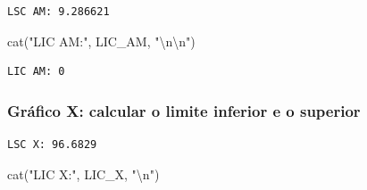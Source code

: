\documentclass[
  letterpaper,
  DIV=11,
  numbers=noendperiod]{scrartcl}
\newenvironment{Shaded}{\begin{snugshade}}{\end{snugshade}}
\newcommand{\AttributeTok}[1]{\textcolor[rgb]{0.40,0.45,0.13}{#1}}
\newcommand{\CommentTok}[1]{\textcolor[rgb]{0.37,0.37,0.37}{#1}}
\newcommand{\ConstantTok}[1]{\textcolor[rgb]{0.56,0.35,0.01}{#1}}
\newcommand{\DecValTok}[1]{\textcolor[rgb]{0.68,0.00,0.00}{#1}}
\newcommand{\FloatTok}[1]{\textcolor[rgb]{0.68,0.00,0.00}{#1}}
\newcommand{\FunctionTok}[1]{\textcolor[rgb]{0.28,0.35,0.67}{#1}}
\newcommand{\NormalTok}[1]{\textcolor[rgb]{0.00,0.23,0.31}{#1}}
\newcommand{\OtherTok}[1]{\textcolor[rgb]{0.00,0.23,0.31}{#1}}
\newcommand{\SpecialCharTok}[1]{\textcolor[rgb]{0.37,0.37,0.37}{#1}}
\newcommand{\StringTok}[1]{\textcolor[rgb]{0.13,0.47,0.30}{#1}}
\begin{document}
\begin{verbatim}
LSC AM: 9.286621 
\end{verbatim}

\begin{Shaded}
\begin{Highlighting}[]
\FunctionTok{cat}\NormalTok{(}\StringTok{"LIC AM:"}\NormalTok{, LIC\_AM, }\StringTok{"}\SpecialCharTok{\textbackslash{}n\textbackslash{}n}\StringTok{"}\NormalTok{)}
\end{Highlighting}
\end{Shaded}

\begin{verbatim}
LIC AM: 0 
\end{verbatim}

\subsubsection{Gráfico X: calcular o limite inferior e o
superior}\label{gruxe1fico-x-calcular-o-limite-inferior-e-o-superior}

\begin{Shaded}
\end{Shaded}

\begin{verbatim}
LSC X: 96.6829 
\end{verbatim}

\begin{Shaded}
\begin{Highlighting}[]
\FunctionTok{cat}\NormalTok{(}\StringTok{"LIC X:"}\NormalTok{, LIC\_X, }\StringTok{"}\SpecialCharTok{\textbackslash{}n}\StringTok{"}\NormalTok{)}
\end{Highlighting}
\end{Shaded}
\end{document}
